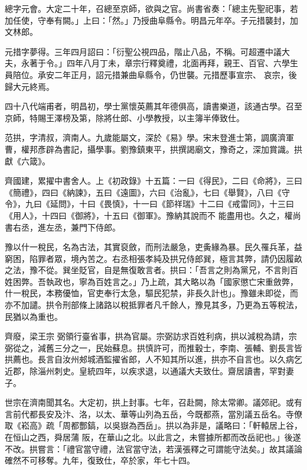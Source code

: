 \begin{pinyinscope}
 總字元會。大定二十年，召總至京師，欲與之官。尚書省奏：「總主先聖祀事，若加任使，守奉有闕。」上曰：「然。」乃授曲阜縣令。明昌元年卒。子元措襲封，加文林郎。



 元措字夢得。三年四月詔曰：「衍聖公視四品，階止八品，不稱。可超遷中議大夫，永著于令。」四年八月丁未，章宗行釋奠禮，北面再拜，親王、百官、六學生員陪位。承安二年正月，詔元措兼曲阜縣令，仍世襲。元措歷事宣宗、
 哀宗，後歸大元終焉。



 四十八代端甫者，明昌初，學士黨懷英薦其年德俱高，讀書樂道，該通古學。召至京師，特賜王澤榜及第，除將仕郎、小學教授，以主簿半俸致仕。



 范拱，字清叔，濟南人。九歲能屬文，深於《易》學。宋末登進士第，調廣濟軍曹，權邦彥辟為書記，攝學事。劉豫鎮東平，拱撰謁廟文，豫奇之，深加賞識。拱獻《六箴》。



 齊國建，累擢中書舍人。上《初政錄》十五篇：一曰《得民》，二曰《命將》，三曰《簡禮》，四曰《納諫》，五曰《遠圖》，六曰《治亂》，七曰《舉賢》，八曰《守令》，九曰《延問》，十曰《畏慎》，十一曰《節祥瑞》十二曰《戒雷同》，十三曰《用人》，十四曰《御將》，十五曰《御軍》。豫納其說而不
 能盡用也。久之，權尚書右丞，進左丞，兼門下侍郎。



 豫以什一稅民，名為古法，其實裒斂，而刑法嚴急，吏夤緣為暴。民久罹兵革，益窮困，陷罪者眾，境內苦之。右丞相張孝純及拱兄侍郎巽，極言其弊，請仍因履畝之法，豫不從。巽坐貶官，自是無復敢言者。拱曰：「吾言之則為黨兄，不言則百姓困弊。吾執政也，寧為百姓言之。」乃上疏，其大略以為「國家懲亡宋重斂弊，什一稅民，本務優恤，官吏奉行太急，驅民犯禁，非長久計也」。豫雖未即從，而亦不加譴。拱令刑部條上諸路以稅抵罪者凡千餘人，豫見其多，乃更為五等稅法，民猶以為重也。



 齊廢，梁王宗
 弼領行臺省事，拱為官屬。宗弼訪求百姓利病，拱以減稅為請，宗弼從之，減舊三分之一，民始蘇息。拱慎許可，而推轂士，李南、張輔、劉長言皆拱薦也。長言自汝州郟城酒監擢省郎，人不知其所以進，拱亦不自言也。以久病乞近郡，除淄州刺史。皇統四年，以疾求退，以通議大夫致仕。齋居讀書，罕對妻子。



 世宗在濟南聞其名。大定初，拱上封事。七年，召赴闕，除太常卿。議郊祀。或有言前代都長安及汴、洛，以太、華等山列為五岳，今既都燕，當別議五岳名。寺僚取《崧高》疏「周都酆鎬，以吳嶽為西岳」。拱以為非是，議略曰：「軒轅居上谷，在恒山之西，舜居蒲
 阪，在華山之北。以此言之，未嘗據所都而改岳祀也。」後遂不改。拱嘗言：「禮官當守禮，法官當守法，若漢張釋之可謂能守法矣。」故其議論確然不可移奪。九年，復致仕，卒於家，年七十四。




\end{pinyinscope}
